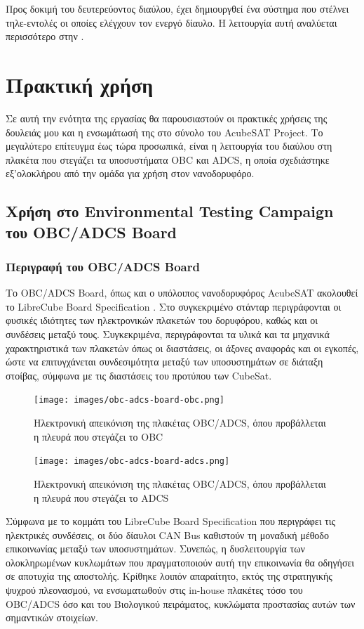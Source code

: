 \documentclass[a4paper,nobib,justified]{tufte-book}
\begin{document}
Προς δοκιμή του δευτερεύοντος διαύλου, έχει δημιουργθεί ένα σύστημα που στέλνει τηλε-εντολές οι οποίες ελέγχουν τον ενεργό δίαυλο. Η λειτουργία αυτή αναλύεται περισσότερο στην .

\clearpage

\chapter{Πρακτική χρήση}
\label{chap:usage}
Σε αυτή την ενότητα της εργασίας θα παρουσιαστούν οι πρακτικές χρήσεις της δουλειάς μου και η ενσωμάτωσή της στο σύνολο του AcubeSAT Project. Το μεγαλύτερο επίτευγμα έως τώρα προσωπικά, είναι η λειτουργία του διαύλου στη πλακέτα που στεγάζει τα υποσυστήματα OBC και ADCS, η οποία σχεδιάστηκε εξ'ολοκλήρου από την ομάδα για χρήση στον νανοδορυφόρο.
\section{Χρήση στο Environmental Testing Campaign του OBC/ADCS Board}
\subsection{Περιγραφή του OBC/ADCS Board}
Το OBC/ADCS Board, όπως και ο υπόλοιπος νανοδορυφόρος AcubeSAT ακολουθεί το LibreCube Board Specification . Στο συγκεκριμένο στάνταρ περιγράφονται οι φυσικές ιδιότητες των ηλεκτρονικών πλακετών του δορυφόρου, καθώς και οι συνδέσεις μεταξύ τους. Συγκεκριμένα, περιγράφονται τα υλικά και τα μηχανικά χαρακτηριστικά των πλακετών όπως οι διαστάσεις, οι άξονες αναφοράς και οι εγκοπές, ώστε να επιτυγχάνεται συνδεσιμότητα μεταξύ των υποσυστημάτων σε διάταξη στοίβας, σύμφωνα με τις διαστάσεις του προτύπου των CubeSat.

\begin{figure}
	\centering
	\texttt{[image: images/obc-adcs-board-obc.png]}
	\caption[Ηλεκτρονική απεικόνιση της πλακέτας OBC/ADCS]{Ηλεκτρονική απεικόνιση της πλακέτας OBC/ADCS, όπου προβάλλεται η πλευρά που στεγάζει το OBC}
	\label{fig:obc-adcs-board-obc}
\end{figure}

\begin{figure}
	\centering
	\texttt{[image: images/obc-adcs-board-adcs.png]}
	\caption[Ηλεκτρονική απεικόνιση της πλακέτας OBC/ADCS]{Ηλεκτρονική απεικόνιση της πλακέτας OBC/ADCS, όπου προβάλλεται η πλευρά που στεγάζει το ADCS}
	\label{fig:obc-adcs-board-adcs}
\end{figure}
Σύμφωνα με το κομμάτι του LibreCube Board Specification που περιγράφει τις ηλεκτρικές συνδέσεις, οι δύο δίαυλοι CAN Bus καθιστούν τη μοναδική μέθοδο επικοινωνίας μεταξύ των υποσυστημάτων. Συνεπώς, η δυσλειτουργία των ολοκληρωμένων κυκλωμάτων που πραγματοποιούν αυτή την επικοινωνία θα οδηγήσει σε αποτυχία της αποστολής. Κρίθηκε λοιπόν απαραίτητο, εκτός της στρατηγικής ψυχρού πλεονασμού, να ενσωματωθούν στις in-house πλακέτες τόσο του OBC/ADCS όσο και του Βιολογικού πειράματος, κυκλώματα προστασίας αυτών των σημαντικών στοιχείων. 
\end{document}
